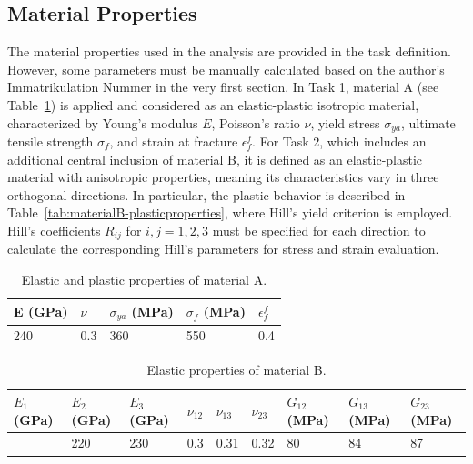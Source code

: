 \documentclass[12pt]{article}
\begin{document}
\subsection{Material Properties}
\hspace*{2em}The material properties used in the analysis are provided in the task definition. However, 
some parameters must be manually calculated based on the author's Immatrikulation Nummer in the very first section.
In Task 1, material A (see Table~\ref{tab:materialA-properties}) is applied and considered as an elastic-plastic isotropic material, 
characterized by Young's modulus $E$, Poisson's ratio $\nu$, yield stress $\sigma_{ya}$, ultimate tensile strength $\sigma_{f}$, 
and strain at fracture $\epsilon_{f}^{f}$.
For Task 2, which includes an additional central inclusion of material B, it is defined as an elastic-plastic material 
with anisotropic properties, meaning its characteristics vary in three orthogonal directions. 
In particular, the plastic behavior is described in Table~\ref{tab:materialB-plasticproperties},
where Hill's yield criterion is employed. Hill's coefficients $R_{ij}$ for $i,j = 1,2,3$ must be 
specified for each direction to calculate the corresponding Hill's parameters for stress and strain evaluation.


\begin{table}[H]
    \centering
    \caption{Elastic and plastic properties of material A.}
    \label{tab:materialA-properties}
    \begin{tabular}{lllll}
        \toprule
        E (GPa) & $\nu$ & $\sigma_{ya}$ (MPa) & $\sigma_{f}$ (MPa) & $\epsilon_{f}^{f}$ \\
        \midrule
        240 & 0.3 & 360 & 550 & 0.4 \\
        \bottomrule
    \end{tabular}
\end{table}

\begin{table}[H]
    \centering
    \caption{Elastic properties of material B.}
    \label{tab:materialB-elasticproperties}
    \begin{tabular}{lllllllll}
        \toprule
            \centering $E_1$ (GPa) & $E_2$ (GPa) & $E_3$ (GPa) & $\nu_{12}$ & $\nu_{13}$ & $\nu_{23}$ & $G_{12}$ (MPa) & 
            $G_{13}$ (MPa) & $G_{23}$ (MPa) \\
            \midrule
            \centering 210 & 220 & 230 & 0.3 & 0.31 & 0.32 & 80 & 84 & 87 \\
            \bottomrule
    \end{tabular}
\end{table}
\end{document}

